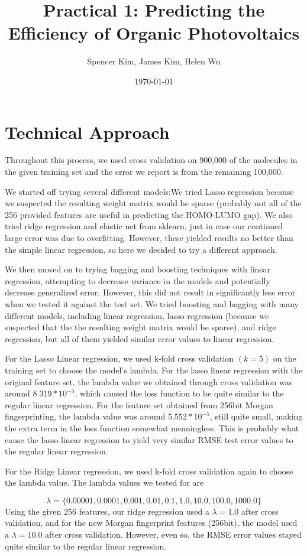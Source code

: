 \documentclass[11pt]{article}
\title{Practical 1: Predicting the Efficiency of Organic Photovoltaics}
\author{Spencer Kim, James Kim, Helen Wu}
\date{\today}
\begin{document}
\maketitle
\section{Technical Approach}
Throughout this process, we used cross validation on 900,000 of the molecules in the given training set and the error we report is from the remaining 100,000.

We started off trying several different models:We tried Lasso regression because we suspected the resulting weight matrix would be sparse (probably not all of the 256 provided features are useful in predicting the HOMO-LUMO gap). We also tried ridge regression and elastic net from sklearn, just in case our continued large error was due to overfitting. However, these yielded results no better than the simple linear regression, so here we decided to try a different approach.

We then moved on to trying bagging and boosting techniques with linear regression, attempting to decrease variance in the models and potentially decrease generalized error. However, this did not result in significantly less error when we tested it against the test set. We tried boosting and bagging with many different models, including linear regression, lasso regression (because we suspected that the the resulting weight matrix would be sparse), and ridge regression, but all of them yielded similar error values to linear regression.

For the Lasso Linear regression, we used k-fold cross validation $(k = 5)$ on the training set to choose the model's lambda. For the lasso linear regression with the original feature set, the lambda value we obtained through cross validation was around $8.319 * 10^{-5}$, which caused the loss function to be quite similar to the regular linear regression. For the feature set obtained from 256bit Morgan fingerprinting, the lambda value was around $5.552 * 10^{-5}$, still quite small, making the extra term in the loss function somewhat meaningless. This is probably what cause the lasso linear regression to yield very similar RMSE test error values to the regular linear regression.

For the Ridge Linear regression, we used k-fold cross validation again to choose the lambda value. The lambda values we tested for are

\[
\lambda = \{ 0.00001, 0.0001, 0.001, 0.01, 0.1, 1.0, 10.0, 100.0, 1000.0 \}
\]
Using the given 256 features, our ridge regression used a $\lambda = 1.0$ after cross validation, and for the new Morgan fingerprint features (256bit), the model used a $\lambda = 10.0$ after cross validation. However, even so, the RMSE error values stayed quite similar to the regular linear regression.
\end{document}
